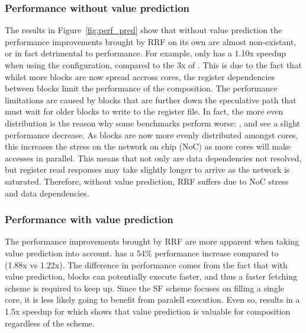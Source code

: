 \subsubsection{Performance without value prediction}
The results in Figure~\ref{fig:perf_pred} show that without value prediction the performance improvements brought by RRF on its own are almost non-existant, or in fact detrimental to performance.
For example,  only has a 1.10x speedup when using the \nfnovp{} configuration, compared to the 3x of \nfvp{}.
This is due to the fact that whilst more blocks are now spread accross cores, the register dependencies between blocks limit the performance of the composition. 
The performance limitations are caused by blocks that are further down the speculative path that must wait for older blocks to write to the register file.
In fact, the more even distribution is the reason why some benchmarks perform worse: ,  and  see a slight performance decrease.
As blocks are now more evenly distributed amongst cores, this increases the stress on the network on chip (NoC) as more cores will make accesses in parallel.
This means that not only are data dependencies not resolved, but register read responses may take slightly longer to arrive as the network is saturated.
Therefore, without value prediction, RRF suffers due to NoC stress and data dependencies.


\subsubsection{Performance with value prediction}
The performance improvements brought by RRF are more apparent when taking value prediction into account.
\nfvp{} has a 54\% performance increase compared to \vp{} (1.88x vs 1.22x).
The difference in performance comes from the fact that with value prediction, blocks can potentially execute faster, and thus a faster fetching scheme is required to keep up.
Since the SF scheme focuses on filling a single core, it is less likely going to benefit from paralell execution.
Even so, \vp{} results in a 1.5x speedup for  which shows that value prediction is valuable for composition regardless of the scheme.

